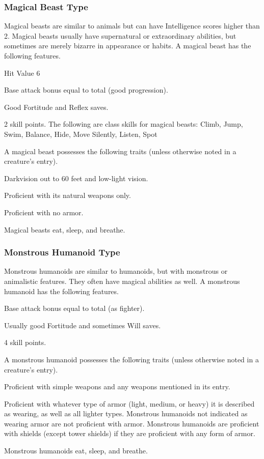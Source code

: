 \subsubsection{Magical Beast Type} Magical beasts are similar to animals but can have Intelligence scores higher than 2. Magical beasts usually have supernatural or extraordinary abilities, but sometimes are merely bizarre in appearance or habits.
 A magical beast has the following features.
\begin{itemize*}
\item Hit Value 6
\item Base attack bonus equal to total  (good progression).
\item Good Fortitude and Reflex saves.
\item 2 skill points. The following are class skills for magical beasts: Climb, Jump, Swim, Balance, Hide, Move Silently, Listen, Spot
\end{itemize*}
 A magical beast possesses the following traits (unless otherwise noted in a creature's entry).
\begin{itemize*}
\item Darkvision out to 60 feet and low-light vision.
\item Proficient with its natural weapons only.
\item Proficient with no armor.
\item Magical beasts eat, sleep, and breathe.
\end{itemize*}

\subsubsection{Monstrous Humanoid Type} Monstrous humanoids are similar to humanoids, but with monstrous or animalistic features. They often have magical abilities as well.
 A monstrous humanoid has the following features.
\begin{itemize*}
\item Base attack bonus equal to total  (as fighter).
\item Usually good Fortitude and sometimes Will saves.
\item 4 skill points.
\end{itemize*}
 A monstrous humanoid possesses the following traits (unless otherwise noted in a creature's entry).
\begin{itemize*}
\item Proficient with simple weapons and any weapons mentioned in its entry.
\item Proficient with whatever type of armor (light, medium, or heavy) it is described as wearing, as well as all lighter types. Monstrous humanoids not indicated as wearing armor are not proficient with armor. Monstrous humanoids are proficient with shields (except tower shields) if they are proficient with any form of armor.
\item Monstrous humanoids eat, sleep, and breathe.
\end{itemize*}

